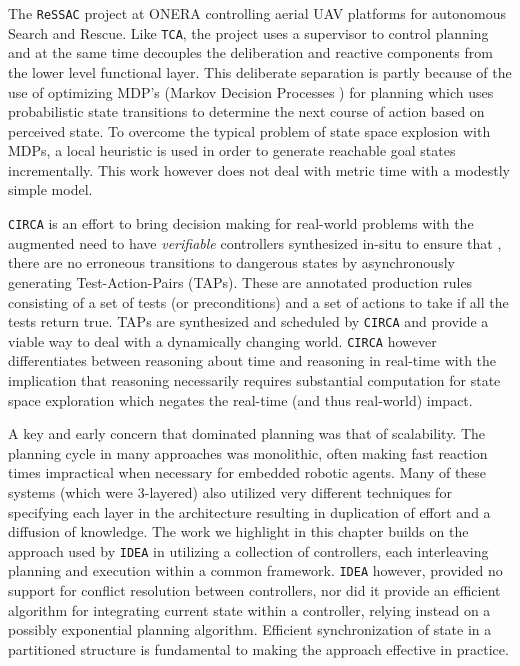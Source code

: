 The \texttt{ReSSAC} project at ONERA \cite{teichteil07}  controlling aerial UAV platforms for autonomous Search
and Rescue. Like \texttt{TCA}, the project uses a supervisor to
control planning and at the same time decouples the deliberation and
reactive components from the lower level functional layer. This
deliberate separation is partly because of the use of optimizing MDP’s
(Markov Decision Processes \cite{mdp93}) for planning which uses
probabilistic state transitions to determine the next course of action
based on perceived state. To overcome the typical problem of state
space explosion with MDPs, a local heuristic is used in order to
generate reachable goal states incrementally. This work however does
not deal with metric time  with a modestly simple
model.

\texttt{CIRCA} \cite{musliner95} is an effort to bring decision making
for real-world problems with the augmented need to have
\emph{verifiable} controllers synthesized in-situ to ensure that
, there are no erroneous
transitions to dangerous states by asynchronously generating
Test-Action-Pairs (TAPs).  These are annotated production rules
consisting of a set of tests (or preconditions) and a set of actions
to take if all the tests return true. TAPs are synthesized and
scheduled by \texttt{CIRCA} and provide a viable way to deal with a
dynamically changing world. \texttt{CIRCA} however differentiates
between reasoning about time and reasoning in real-time with the
implication that reasoning necessarily requires substantial
computation for state space exploration which negates the real-time
(and thus real-world) impact.

A key and early concern that dominated planning was that of
scalability.  The planning cycle in many approaches was  monolithic, often making fast reaction times impractical when
necessary for embedded robotic agents. Many of these systems (which
were $3$-layered) also utilized very different techniques for
specifying each layer in the architecture resulting in duplication of
effort and a diffusion of knowledge.  The work we highlight in this
chapter builds on the approach used by \texttt{IDEA} \cite{mus02,
  mus04} in utilizing a collection of controllers, each interleaving
planning and execution within a common framework. \texttt{IDEA}
however, provided no support for conflict resolution between
controllers, nor did it provide an efficient algorithm for integrating
current state within a controller, relying instead on a possibly
exponential planning algorithm. Efficient synchronization of state in
a partitioned structure is fundamental to making the approach
effective in practice.

